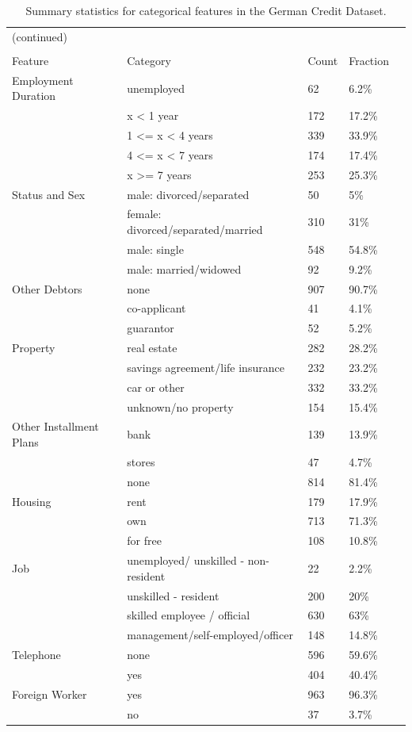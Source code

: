 \documentclass[12pt]{article}
\begin{document}
\begin{table}[!ht]
\centering
\begin{tabular}{lllll}
 (continued)& & &\\ \\
\hline
Feature & Category & Count & Fraction \\ 
  \hline
 Employment Duration & unemployed & 62 & 6.2\% \\ 
&x < 1 year & 172 & 17.2\% \\ 
&1  <= x < 4 years & 339 & 33.9\% \\ 
&4  <= x < 7 years & 174 & 17.4\% \\ 
&x >= 7 years & 253 & 25.3\% \\ 
\hline
Status and Sex & male: divorced/separated & 50 & 5\% \\ 
&female: divorced/separated/married & 310 & 31\% \\ 
&male: single & 548 & 54.8\% \\ 
&male: married/widowed & 92 & 9.2\% \\ 
\hline
 Other Debtors & none & 907 & 90.7\% \\ 
&co-applicant & 41 & 4.1\% \\ 
&guarantor & 52 & 5.2\% \\ 
\hline
  Property & real estate & 282 & 28.2\% \\ 
&savings agreement/life insurance & 232 & 23.2\% \\ 
&car or other& 332 & 33.2\% \\ 
&unknown/no property & 154 & 15.4\% \\ 
\hline
 Other Installment Plans & bank & 139 & 13.9\% \\ 
&stores & 47 & 4.7\% \\ 
&none & 814 & 81.4\% \\ 
\hline
Housing & rent & 179 & 17.9\% \\ 
&own & 713 & 71.3\% \\ 
&for free & 108 & 10.8\% \\ 
\hline
 Job & unemployed/ unskilled  - non-resident & 22 & 2.2\% \\ 
 & unskilled - resident & 200 & 20\% \\ 
 &skilled employee / official & 630 & 63\% \\ 
 &management/self-employed/officer & 148 & 14.8\% \\ 
 \hline
Telephone & none & 596 & 59.6\% \\ 
&yes & 404 & 40.4\% \\ 
 \hline
Foreign Worker & yes & 963 & 96.3\% \\ 
&no & 37 & 3.7\% \\ 
    \hline
\end{tabular}
\caption[Summary Dtatistics for Categorical Features]{Summary statistics for categorical features in the German Credit Dataset.}\label{summary_categorical}
\end{table}
\end{document}
